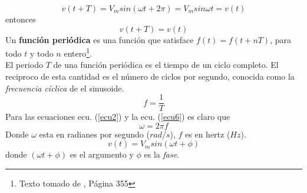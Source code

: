 \documentclass[twocolumn]{IEEEtran}
\begin{document}
\begin{equation}
 v(t+T) = V_{m} sin (\omega t + 2 \pi) = V_{m} sin \omega t = v(t)
\label{ecu4}
\end{equation}
\noindent
entonces
\begin{equation}
 v(t+T) = v(t)
\label{ecu5}
\end{equation}
\noindent
Un \textbf{función periódica} es una función que satisface $f(t) = f(t + nT)$, para todo $t$ y todo $n$ entero\footnote{Texto tomado de \cite{sadiku}, Página 355}.\\
El periodo  $T$ de una función periódica es el tiempo de un ciclo completo. El reciproco de esta cantidad es el número de ciclos por segundo, conocida como la \textit{frecuencia cíclica} de el sinusoide.
\begin{equation}
 f = \frac{1}{T}
\label{ecu6}
\end{equation}
\noindent
Para las ecuaciones ecu. (\ref{ecu2}) y la ecu. (\ref{ecu6}) es claro que
\begin{equation}
 \omega = 2 \pi f
\label{ecu7}
\end{equation}
\noindent
Donde $\omega$ esta en radianes por segundo ($rad/s$), $f$ es en hertz ($Hz$).\\
\begin{equation}
 v(t) = V_{m} sin (\omega t + \phi)
\label{ecu8}
\end{equation}
\noindent
donde $(\omega t + \phi)$ es el argumento y $\phi$ es la \textit{fase}.
\end{document}
